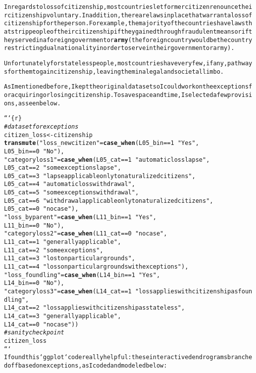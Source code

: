 \documentclass{article}\usepackage[]{graphicx}\usepackage[]{xcolor}
\makeatletter
\newcommand{\hlstr}[1]{\textcolor[rgb]{0.192,0.494,0.8}{#1}}%
\newcommand{\hlcom}[1]{\textcolor[rgb]{0.678,0.584,0.686}{\textit{#1}}}%
\newcommand{\hlkwd}[1]{\textcolor[rgb]{0.737,0.353,0.396}{\textbf{#1}}}%
\newenvironment{kframe}{%
 \def\at@end@of@kframe{}%
 \ifinner\ifhmode%
  \def\at@end@of@kframe{\end{minipage}}%
  \begin{minipage}{\columnwidth}%
 \fi\fi%
 \def\FrameCommand##1{\hskip\@totalleftmargin \hskip-\fboxsep
 \colorbox{shadecolor}{##1}\hskip-\fboxsep
     \hskip-\linewidth \hskip-\@totalleftmargin \hskip\columnwidth}%
 \MakeFramed {\advance\hsize-\width
   \@totalleftmargin\z@ \linewidth\hsize
   \@setminipage}}%
 {\par\unskip\endMakeFramed%
 \at@end@of@kframe}
\newenvironment{knitrout}{}{} %
\makeatother
\begin{document}
\begin{knitrout}
\begin{kframe}
\begin{alltt}
In regards to loss of citizenship, most countries let former citizen renounce their citizenship voluntary. In addition, there are laws in place that warrant a loss of citizenship for the person. For example, the majority of the countries have laws that strip people of their citizenship if they gained through fraudulent means or if they served in a foreign government or \hlkwd{army} (the foreign country would be the country restricting dual nationality in order to serve in their government or army).

Unfortunately for stateless people, most countries have very few, if any, pathways for them to gain citizenship, leaving them in a legal and societal limbo. 

As I mentioned before, I kept the original dataset so I could work on the exceptions for acquiring or losing citizenship. To save space and time, I selected a few provisions, as seen below.

```\{r\}
\hlcom{# dataset for exceptions }
citizen_loss <- citizenship %>%
  \hlkwd{transmute}(\hlstr{"loss_newcitizen"} = \hlkwd{case_when}(L05_bin == 1 ~ \hlstr{"Yes"},
                                          L05_bin == 0 ~ \hlstr{"No"}),
            \hlstr{"categoryloss1"} = \hlkwd{case_when}(L05_cat == 1 ~ \hlstr{"automatic loss lapse"},
                                       L05_cat == 2 ~ \hlstr{"some exceptions lapse"},
                                       L05_cat == 3 ~ \hlstr{"lapse applicable only to naturalized citizens"},
                                       L05_cat == 4 ~ \hlstr{"automatic loss withdrawal"},
                                       L05_cat == 5 ~ \hlstr{"some exceptions withdrawal"},
                                       L05_cat == 6 ~ \hlstr{"withdrawal applicable only to naturalized citizens"},
                                       L05_cat == 0 ~ \hlstr{"no case"}),
            \hlstr{"loss_byparent"} = \hlkwd{case_when}(L11_bin == 1 ~ \hlstr{"Yes"},
                                        L11_bin == 0 ~ \hlstr{"No"}),
            \hlstr{"categoryloss2"} = \hlkwd{case_when}(L11_cat == 0 ~ \hlstr{"no case"}, 
                                       L11_cat == 1 ~ \hlstr{"generally applicable"},
                                       L11_cat == 2 ~ \hlstr{"some exceptions"},
                                       L11_cat == 3 ~ \hlstr{"lost on particular grounds"},
                                       L11_cat == 4 ~ \hlstr{"loss on particular grounds with exceptions"}),
            \hlstr{"loss_foundling"} = \hlkwd{case_when}(L14_bin == 1 ~ \hlstr{"Yes"},
                                         L14_bin == 0 ~ \hlstr{"No"}),
            \hlstr{"categoryloss3"} = \hlkwd{case_when}(L14_cat == 1  ~ \hlstr{"loss applies with citizenship as foundling"},
                                        L14_cat == 2 ~ \hlstr{"loss applies with citizenship as stateless"},
                                        L14_cat == 3 ~ \hlstr{"generally applicable"},
                                        L14_cat == 0 ~ \hlstr{"no case"}))
\hlcom{# sanity checkpoint}
citizen_loss
```
I found this `ggplot` code really helpful: these interactive dendrograms branched off based on exceptions, as I coded and modeled below: 


\end{alltt}
\end{kframe}
\end{knitrout}
\end{document}
